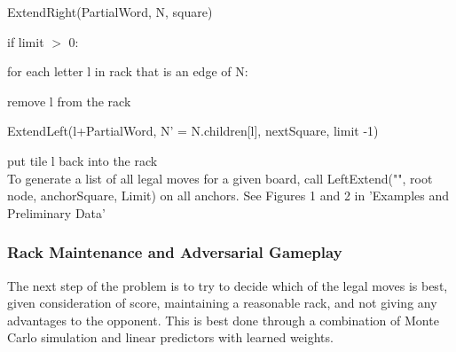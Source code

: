 \documentclass[12pt]{article}
\begin{document}
\quad\quad ExtendRight(PartialWord, N, square)

\quad\quad if limit $>$ 0: 

\quad\quad\quad for each letter l in rack that is an edge of N: 

\quad\quad\quad\quad remove l from the rack

\quad\quad\quad\quad ExtendLeft(l+PartialWord, N' =
N.children[l], nextSquare, limit -1)

\quad\quad\quad\quad put tile l back into the rack\\
			
To generate a list of all legal moves for a given board, call
LeftExtend("", root node, anchorSquare, Limit) on all anchors. See
Figures 1 and 2 in 'Examples and Preliminary Data'




\subsubsection*{Rack Maintenance and Adversarial Gameplay}
The next step of the problem is to try to decide which of the legal
moves is best, given consideration of score, maintaining a reasonable
rack, and not giving any advantages to the opponent. This is best done
through a combination of Monte Carlo simulation and linear predictors
with learned weights.
\end{document}

